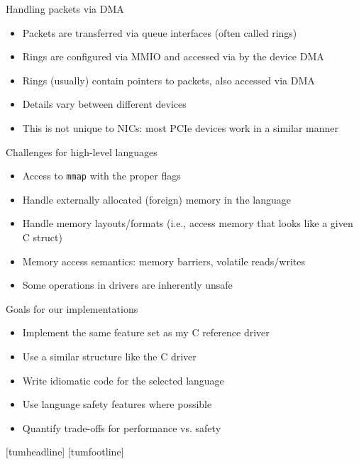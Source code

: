 \documentclass[NET,english,aspectratio=169,notitleframe]{tumbeamer}
\begin{document}
\begin{frame}{Handling packets via DMA}
\begin{itemize}
\item Packets are transferred via queue interfaces (often called rings)
\item Rings are configured via MMIO and accessed via by the device DMA
\item Rings (usually) contain pointers to packets, also accessed via DMA
\pause
\vspace{1em}
\item Details vary between different devices
\item This is not unique to NICs: most PCIe devices work in a similar manner
\end{itemize}
\end{frame}


\begin{frame}{Challenges for high-level languages}
\begin{itemize}
\item Access to \texttt{mmap} with the proper flags
\item Handle externally allocated (foreign) memory in the language
\item Handle memory layouts/formats (i.e., access memory that looks like a given C struct)
\item Memory access semantics: memory barriers, volatile reads/writes
\item Some operations in drivers are inherently unsafe
\end{itemize}
\end{frame}


\begin{frame}{Goals for our implementations}
\begin{itemize}
\item Implement the same feature set as my C reference driver
\item Use a similar structure like the C driver
\item Write idiomatic code for the selected language
\item Use language safety features where possible
\item Quantify trade-offs for performance vs. safety
\end{itemize}
\end{frame}

[tumheadline]
[tumfootline]
\begin{frame}{}
\centering {}
\end{frame}
\end{document}
